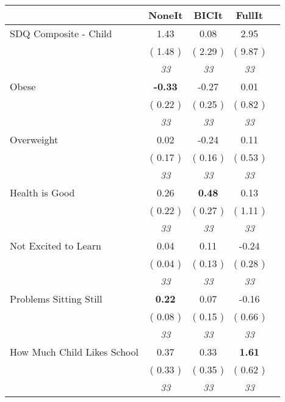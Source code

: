 \begin{tabular}{l c c c c}
\toprule
 & NoneIt & BICIt & FullIt \\
\midrule
SDQ Composite - Child &      1.43 &      0.08 &      2.95 \\
& (     1.48 ) & (     2.29 ) & (     9.87 ) \\
& \textit{ 33 } & \textit{ 33 } & \textit{ 33 } \\
Obese & \textbf{     -0.33 } &     -0.27 &      0.01 \\
& (     0.22 ) & (     0.25 ) & (     0.82 ) \\
& \textit{ 33 } & \textit{ 33 } & \textit{ 33 } \\
Overweight &      0.02 &     -0.24 &      0.11 \\
& (     0.17 ) & (     0.16 ) & (     0.53 ) \\
& \textit{ 33 } & \textit{ 33 } & \textit{ 33 } \\
Health is Good &      0.26 & \textbf{      0.48 } &      0.13 \\
& (     0.22 ) & (     0.27 ) & (     1.11 ) \\
& \textit{ 33 } & \textit{ 33 } & \textit{ 33 } \\
Not Excited to Learn &      0.04 &      0.11 &     -0.24 \\
& (     0.04 ) & (     0.13 ) & (     0.28 ) \\
& \textit{ 33 } & \textit{ 33 } & \textit{ 33 } \\
Problems Sitting Still & \textbf{      0.22 } &      0.07 &     -0.16 \\
& (     0.08 ) & (     0.15 ) & (     0.66 ) \\
& \textit{ 33 } & \textit{ 33 } & \textit{ 33 } \\
How Much Child Likes School &      0.37 &      0.33 & \textbf{      1.61 } \\
& (     0.33 ) & (     0.35 ) & (     0.62 ) \\
& \textit{ 33 } & \textit{ 33 } & \textit{ 33 } \\
\bottomrule
\end{tabular}
